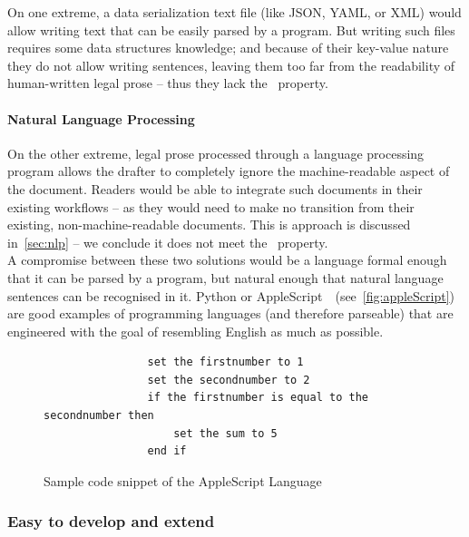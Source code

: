 On one extreme, a data serialization text file (like JSON, YAML, or XML) would allow writing text that can be easily parsed by a program.
But writing such files requires some data structures knowledge;
and because of their key-value nature they do not allow writing sentences, leaving them too far from the readability of human-written legal prose -- thus they lack the~ property.

\paragraph{Natural Language Processing}

On the other extreme, legal prose processed through a language processing program allows the drafter to completely ignore the machine-readable aspect of the document.
Readers would be able to integrate such documents in their existing workflows -- as they would need to make no transition from their existing, non-machine-readable documents.
This is approach is discussed in~\autoref{sec:nlp} -- we conclude it does not meet the~ property.  \\

A compromise between these two solutions would be a language formal enough that it can be parsed by a program, but natural enough that natural language sentences can be recognised in it.
Python or AppleScript~\cite{Sanderson2010appleScript}~(see~\autoref{fig:appleScript}) are good examples of programming languages (and therefore parseable) that are engineered with the goal of resembling English as much as possible.

\begin{figure}[h]
    \centering
    \begin{minipage}{0.8\textwidth}
        \begin{verbatim}
                set the firstnumber to 1
                set the secondnumber to 2
                if the firstnumber is equal to the secondnumber then
                    set the sum to 5
                end if
        \end{verbatim}
    \end{minipage}
    \caption{Sample code snippet of the AppleScript Language~\cite{Sanderson2010appleScript}}
    \label{fig:appleScript}
\end{figure}

\subsubsection{Easy to develop and extend}


